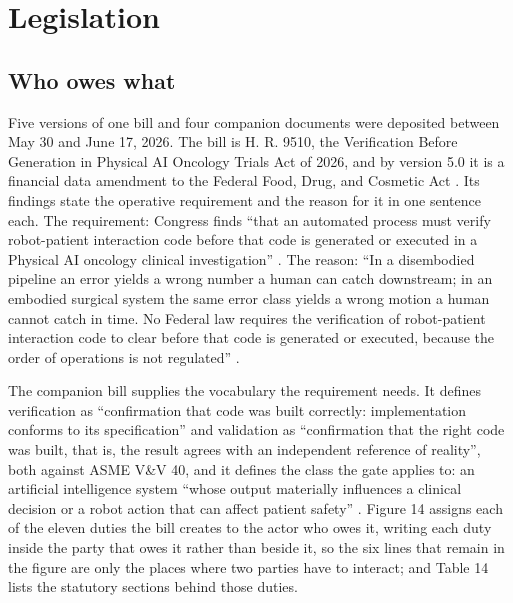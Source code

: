 \section{Legislation}
\label{sec:legislation}

\subsection{Who owes what}

Five versions of one bill and four companion documents were deposited between
May 30 and June 17, 2026. The bill is H. R. 9510, the Verification Before
Generation in Physical AI Oncology Trials Act of 2026, and by version 5.0 it is
a financial data amendment to the Federal Food, Drug, and Cosmetic Act
\cite{hr9510billv5}. Its findings state the operative requirement and the reason
for it in one sentence each. The requirement: Congress finds ``that an automated
process must verify robot-patient interaction code before that code is generated
or executed in a Physical AI oncology clinical investigation'' \cite{hr9510billv5}.
The reason: ``In a disembodied pipeline an error yields a wrong number a human
can catch downstream; in an embodied surgical system the same error class yields
a wrong motion a human cannot catch in time. No Federal law requires the
verification of robot-patient interaction code to clear before that code is
generated or executed, because the order of operations is not regulated''
\cite{hr9510billv5, verifygenact}.

The companion bill supplies the vocabulary the requirement needs. It defines
verification as ``confirmation that code was built correctly: implementation
conforms to its specification'' and validation as ``confirmation that the right
code was built, that is, the result agrees with an independent reference of
reality'', both against ASME V\&V 40, and it defines the class the gate applies
to: an artificial intelligence system ``whose output materially influences a
clinical decision or a robot action that can affect patient safety''
\cite{vvuqbill2026, asmevv40}. Figure 14 assigns each of the eleven duties the
bill creates to the actor who owes it, writing each duty inside the party that
owes it rather than beside it, so the six lines that remain in the figure are
only the places where two parties have to interact; and Table 14 lists the
statutory sections behind those duties.

